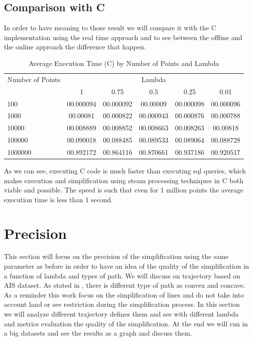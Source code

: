 \subsection{Comparison with C}
In order to have meaning to those result we will compare it with the C implementation using the real time approach and to see between the offline and the online approach the difference that happen.

\begin{table}[htbp]
    \centering
    \label{tab:execution_time_c}
    \begin{tabular}{@{}lccccc@{}}
        \toprule
        Number of Points & \multicolumn{5}{c}{Lambda} \\
        \cmidrule{2-6}
        & 1         & 0.75       & 0.5        & 0.25       & 0.01       \\
        \midrule
        100              & 00.000094 & 00.000092 & 00.00009 & 00.000098 & 00.000096 \\
        1000             & 00.00081  & 00.000822 & 00.000943 & 00.000876 & 00.000788 \\
        10000            & 00.008889 & 00.008852 & 00.008663 & 00.008263 & 00.00818 \\
        100000           & 00.090018  & 00.088485 & 00.089533 & 00.089064 & 00.088728 \\
        1000000          & 00.892172 & 00.864116 & 00.870661 & 00.937186 & 00.920517 \\
        \bottomrule
    \end{tabular}
    \caption{Average Execution Time (C) by Number of Points and Lambda}
\end{table}

As we can see, executing C code is much faster than executing sql queries, which makes execution and simplification using steam processing techniques in C both viable and possible. The speed is such that even for 1 million points the average execution time is less than 1 second.

\section{Precision}
This section will focus on the precision of the simplification using the same parameter as before in order to have an idea of the quality of the simplification in a function of lambda and types of path. We will discuss on trajectory based on AIS dataset. As stated in \cite{abam2007streaming}, there is different type of path as convex and concave. As a reminder this work focus on the simplification of lines and do not take into account land or see restriction during the simplification process. In this section we will analyze different trajectory defines them and see with different lambda and metrics evaluation the quality of the simplification. At the end we will run in a big datasets and see the results as a graph and discuss them.

